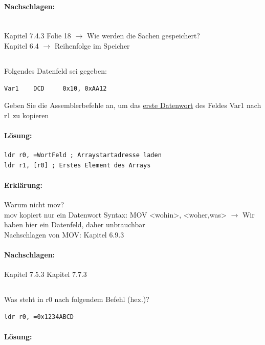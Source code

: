 \documentclass[12pt,twoside,a4paper]{article}
\begin{document}
\paragraph*{Nachschlagen:}\\
Kapitel 7.4.3 Folie 18 $\rightarrow$ Wie werden die Sachen gespeichert?\\
Kapitel 6.4 $\rightarrow$ Reihenfolge im Speicher\\

\subsection{}
Folgendes Datenfeld sei gegeben:
\begin{lstlisting}
Var1 	DCD 	0x10, 0xAA12
\end{lstlisting}
Geben Sie die Assemblerbefehle an, um das \underline{erste Datenwort} des Feldes Var1 nach r1 zu kopieren

\paragraph*{Lösung:}
\begin{lstlisting}
ldr r0, =WortFeld ; Arraystartadresse laden 
ldr r1, [r0] ; Erstes Element des Arrays
\end{lstlisting}
\paragraph*{Erklärung:}
Warum nicht mov?\\
mov kopiert nur ein Datenwort Syntax: MOV <wohin>, <woher,was> $\rightarrow$ Wir haben hier ein Datenfeld, daher unbrauchbar\\
Nachschlagen von MOV: Kapitel 6.9.3\\
\paragraph*{Nachschlagen:}
Kapitel 7.5.3
Kapitel 7.7.3


\subsection{}
Was steht in r0 nach folgendem Befehl (hex.)?
\begin{lstlisting}
ldr r0, =0x1234ABCD
\end{lstlisting}


\paragraph*{Lösung:}
\end{document}
